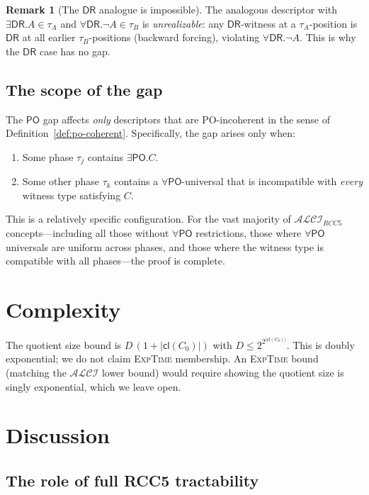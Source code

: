\documentclass[a4paper,11pt]{article}
\theoremstyle{definition}
\newtheorem{remark}[theorem]{Remark}
\newcommand{\ALCI}{\ensuremath{\mathcal{ALCI}}}
\newcommand{\ALCIRCC}[1]{\ensuremath{\mathcal{ALCI}_{\mathit{RCC#1}}}}
\newcommand{\DR}{\ensuremath{\mathsf{DR}}}
\newcommand{\PO}{\ensuremath{\mathsf{PO}}}
\newcommand{\cl}{\ensuremath{\mathsf{cl}}}
\newcommand{\EXPTIME}{\textsc{ExpTime}}
\begin{document}
\begin{remark}[The $\DR$ analogue is impossible]
The analogous descriptor with $\exists\DR.A \in \tau_A$ and
$\forall\DR.\neg A \in \tau_B$ is \emph{unrealizable}: any
$\DR$-witness at a $\tau_A$-position is $\DR$ at all earlier
$\tau_B$-positions (backward forcing), violating
$\forall\DR.\neg A$.  This is why the $\DR$ case has no gap.
\end{remark}

\subsection{The scope of the gap}

The $\PO$ gap affects \emph{only} descriptors that are
PO-incoherent in the sense of Definition~\ref{def:po-coherent}.
Specifically, the gap arises only when:
\begin{enumerate}
\item Some phase $\tau_j$ contains $\exists\PO.C$.
\item Some other phase $\tau_k$ contains a $\forall\PO$-universal
  that is incompatible with \emph{every} witness type satisfying $C$.
\end{enumerate}
This is a relatively specific configuration.  For the vast majority
of $\ALCIRCC{5}$ concepts---including all those without
$\forall\PO$ restrictions, those where $\forall\PO$ universals are
uniform across phases, and those where the witness type is compatible
with all phases---the proof is complete.


\section{Complexity}\label{sec:complexity}

The quotient size bound is $D\,(1 + |\cl(C_0)|)$ with
$D \le 2^{2^{|\cl(C_0)|}}$.  This is doubly exponential; we do not
claim \EXPTIME{} membership.  An \EXPTIME{} bound (matching the
$\ALCI$ lower bound) would require showing the quotient size is
singly exponential, which we leave open.


\section{Discussion}\label{sec:discussion}

\subsection{The role of full RCC5 tractability}
\end{document}
